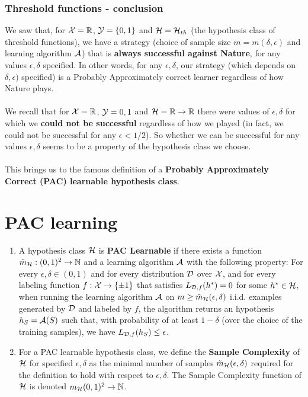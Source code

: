 \subsubsection{Threshold functions - conclusion}

We saw that, for $\mathcal{X}=\mathbb{R}$, $\mathcal{Y}=\{0,1\}$ and $\mathcal{H}=\mathcal{H}_{th}$ (the hypothesis class of threshold functions), we have a strategy (choice of sample size $m=m(\delta,\epsilon)$ and learning algorithm $\mathcal{A}$) that is {\bf always successful against Nature}, for any values $\epsilon, \delta$ specified. In other words, for any  $\epsilon, \delta$, our strategy (which depends on $\delta,\epsilon)$ specified) is a Probably Approximately correct learner regardless of how Nature plays. 
\\~\\
We recall that for $\mathcal{X}=\mathbb{R}$, $\mathcal{Y}={0,1}$ and $\mathcal{H}=\mathbb{R}\to\mathbb{R}$ there were values of $\epsilon, \delta$ for which we {\bf could not be successful} regardless of how we played (in fact, we could not be successful for any $\epsilon<1/2$). So whether we can be successful for any values $\epsilon, \delta$ seems to be a property of the hypothesis class we choose. 
\\~\\
This brings us to the famous definition of a {\bf Probably Approximately Correct (PAC) learnable hypothesis class}.


\section{PAC learning}
\begin{definition}
\begin{enumerate}
\item
A hypothesis class $\mathcal{H}$ is {\bf PAC Learnable} if there exists a function $\tilde{m}_{\mathcal{H}} : (0,1)^2 \to \mathbb{N}$ and a learning algorithm $\mathcal{A}$ with the following property:
For every $\epsilon,\delta \in (0,1)$ and for every distribution $\mathcal{D}$ over $\mathcal{X}$, and for every labeling function 
$f:\mathcal{X}\to\{\pm 1\}$ that satisfies $L_{\mathcal{D},f}(h^*)=0$ for some $h^*\in\mathcal{H}$, when running the learning algorithm $\mathcal{A}$ on $m\ge \tilde{m}_{\mathcal{H}}(\epsilon,\delta)$ i.i.d. examples generated by $\mathcal{D}$ and labeled by $f$, the algorithm returns an hypothesis $h_S=\mathcal{A}(S)$ such that, with probability of at least $1-\delta$ (over the choice of the training samples), we have
$
L_{\mathcal{D}, f}(h_S) \le \epsilon
$. 
\item For a PAC learnable hypothesis class, we define the {\bf Sample Complexity} of $\mathcal{H}$ for specified $\epsilon,\delta$ as the minimal number of samples $\tilde{m}_{\mathcal{H}}(\epsilon,\delta)$ required for the definition to hold with respect to $\epsilon,\delta$. The Sample Complexity function of $\mathcal{H}$ is denoted $m_{\mathcal{H}}(0,1)^2\to\mathbb{N}$.
\end{enumerate}
\end{definition}


